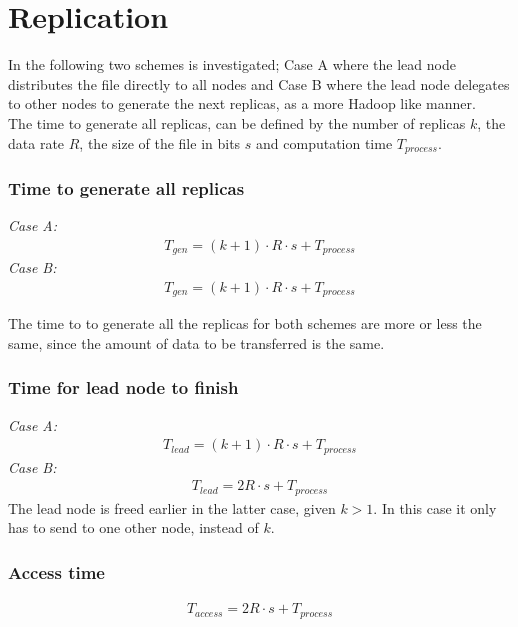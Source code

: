 \section{Replication} \label{sec:repl}
In the following two schemes is investigated; Case A where the lead node distributes the file directly to all nodes and Case B where the lead node delegates to other nodes to generate the next replicas, as a more Hadoop like manner. \\
The time to generate all replicas, can be defined by the number of replicas $k$, the data rate $R$, the size of the file in bits $s$ and computation time $T_{process}$. 

\subsubsection*{Time to generate all replicas}
\textit{Case A:} 
\begin{align} 
    T_{gen} = (k+1)\cdot R\cdot s + T_{process} \label{eq:e2_rep_A}
\end{align}
\textit{Case B:} 
\begin{align}
    T_{gen} = (k+1)\cdot R\cdot s + T_{process} \label{eq:e2_rep_B}
\end{align}

The time to to generate all the replicas for both schemes are more or less the same, since the amount of data to be transferred is the same. 

\subsubsection*{Time for lead node to finish}
\textit{Case A:}
\begin{align} 
    T_{lead} = (k+1)\cdot R\cdot s + T_{process} \label{eq:e2_lead_A}
\end{align}
\textit{Case B:}
\begin{align} 
    T_{lead} = 2R \cdot s + T_{process} \label{eq:e2_lead_B}
\end{align}
The lead node is freed earlier in the latter case, given $k > 1$. In this case it only has to send to one other node, instead of $k$.

\subsubsection*{Access time}
\begin{align}
    T_{access} = 2R \cdot s + T_{process}
\end{align}

